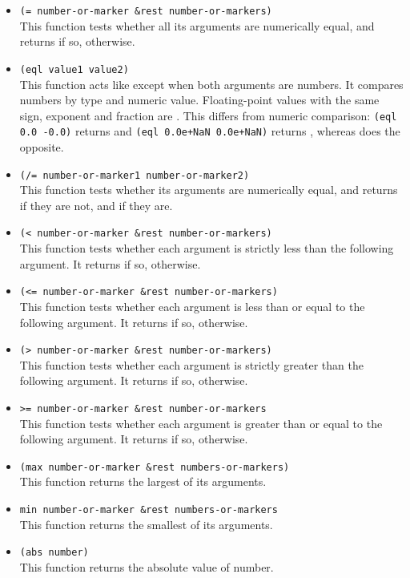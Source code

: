 \begin{itemize}[itemsep=10pt]
\item \lstinline|(= number-or-marker &rest number-or-markers)|\\
  This function tests whether all its arguments are numerically equal, and returns  if so,  otherwise.
\item \lstinline|(eql value1 value2)|\\
  This function acts like  except when both arguments are numbers.
  It compares numbers by type and numeric value.
  Floating-point values with the same sign, exponent and fraction are .
  This differs from numeric comparison: \lstinline|(eql 0.0 -0.0)| returns  and \lstinline|(eql 0.0e+NaN 0.0e+NaN)| returns , whereas \argument{=} does the opposite.
\item \lstinline|(/= number-or-marker1 number-or-marker2)|\\
  This function tests whether its arguments are numerically equal, and returns  if they are not, and  if they are.
\item \lstinline|(< number-or-marker &rest number-or-markers)|\\
  This function tests whether each argument is strictly less than the following argument.
  It returns  if so,  otherwise.
\item \lstinline|(<= number-or-marker &rest number-or-markers)|\\
  This function tests whether each argument is less than or equal to the following argument.
  It returns  if so,  otherwise.
\item \lstinline|(> number-or-marker &rest number-or-markers)|\\
  This function tests whether each argument is strictly greater than the following argument.
  It returns  if so,  otherwise.  
\item \lstinline|>= number-or-marker &rest number-or-markers|\\
  This function tests whether each argument is greater than or equal to the following argument.
  It returns  if so,  otherwise.  
\item \lstinline|(max number-or-marker &rest numbers-or-markers)|\\
  This function returns the largest of its arguments.
\item \lstinline|min number-or-marker &rest numbers-or-markers|\\
  This function returns the smallest of its arguments.
\item \lstinline|(abs number)|\\
  This function returns the absolute value of number.
\end{itemize}

